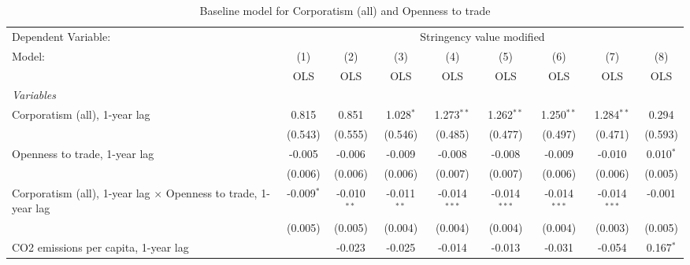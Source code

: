 
\begin{table}[htbp]
   \caption{Baseline model for Corporatism (all) and Openness to trade}
   \centering
   \begin{tabular}{lcccccccc}
      \toprule
      Dependent Variable: & \multicolumn{8}{c}{Stringency value modified}\\
      Model:                                                                & (1)          & (2)           & (3)           & (4)            & (5)            & (6)            & (7)            & (8)\\  
                                                                            &  OLS         & OLS           & OLS           & OLS            & OLS            & OLS            & OLS            & OLS\\  
      \midrule
      \emph{Variables}\\
      Corporatism (all), 1-year lag                                         & 0.815        & 0.851         & 1.028$^{*}$   & 1.273$^{**}$   & 1.262$^{**}$   & 1.250$^{**}$   & 1.284$^{**}$   & 0.294\\   
                                                                            & (0.543)      & (0.555)       & (0.546)       & (0.485)        & (0.477)        & (0.497)        & (0.471)        & (0.593)\\   
      Openness to trade, 1-year lag                                         & -0.005       & -0.006        & -0.009        & -0.008         & -0.008         & -0.009         & -0.010         & 0.010$^{*}$\\   
                                                                            & (0.006)      & (0.006)       & (0.006)       & (0.007)        & (0.007)        & (0.006)        & (0.006)        & (0.005)\\   
      Corporatism (all), 1-year lag $\times$ Openness to trade, 1-year lag  & -0.009$^{*}$ & -0.010$^{**}$ & -0.011$^{**}$ & -0.014$^{***}$ & -0.014$^{***}$ & -0.014$^{***}$ & -0.014$^{***}$ & -0.001\\   
                                                                            & (0.005)      & (0.005)       & (0.004)       & (0.004)        & (0.004)        & (0.004)        & (0.003)        & (0.005)\\   
      CO2 emissions per capita, 1-year lag                                  &              & -0.023        & -0.025        & -0.014         & -0.013         & -0.031         & -0.054         & 0.167$^{*}$\\   

\end{tabular}
\end{table}
